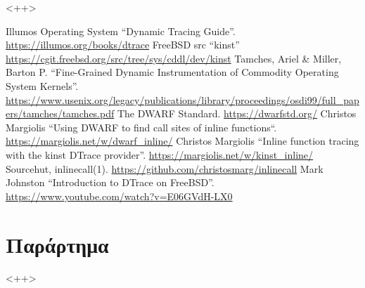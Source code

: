 \documentclass[12pt]{article}
\begin{document}
<++>


\pagebreak
\renewcommand{\refname}{Βιβλιογραφία}
\begin{thebibliography}{00}
 Illumos Operating System ``Dynamic Tracing Guide''.
	\href{https://illumos.org/books/dtrace}{https://illumos.org/books/dtrace} 
 FreeBSD src ``kinst''
	\href{https://cgit.freebsd.org/src/tree/sys/cddl/dev/kinst}
	{https://cgit.freebsd.org/src/tree/sys/cddl/dev/kinst}
 Tamches, Ariel \& Miller, Barton P. ``Fine-Grained Dynamic
	Instrumentation of Commodity Operating System Kernels''.
	\href{https://www.usenix.org/legacy/publications/library/proceedings/osdi99/full\_papers/tamches/tamches.pdf}
	{https://www.usenix.org/legacy/publications/library/proceedings/osdi99/full\_papers/tamches/tamches.pdf}
 The DWARF Standard.
	\href{https://dwarfstd.org/}{https://dwarfstd.org/}
 Christos Margiolis ``Using DWARF to find call sites of
	inline functions``.
	\href{https://margiolis.net/w/dwarf\_inline/}{https://margiolis.net/w/dwarf\_inline/}
 Christos Margiolis ``Inline function tracing with the
	kinst DTrace provider''.
	\href{https://margiolis.net/w/kinst\_inline/}{https://margiolis.net/w/kinst\_inline/}
 Sourcehut, inlinecall(1).
	\href{https://github.com/christosmarg/inlinecall}{https://github.com/christosmarg/inlinecall}
 Mark Johnston ``Introduction to DTrace on FreeBSD''.
	\href{https://www.youtube.com/watch?v=E06GVdH-LX0}{https://www.youtube.com/watch?v=E06GVdH-LX0}
\end{thebibliography}

\pagebreak
\section{Παράρτημα}



<++>
\end{document}
